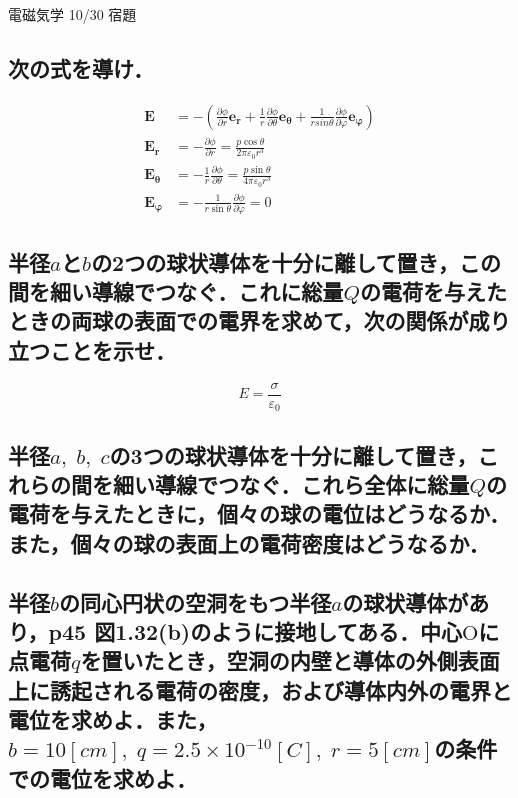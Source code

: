 \documentclass[a4j,12pt]{jsarticle}
\begin{document}
\begin{center}
    \begin{LARGE}
        {\huge 電磁気学 10/30 宿題} 
    \end{LARGE}
\end{center}

\subsection{次の式を導け．}
\vspace*{-2em}
\begin{align}
    \bm{E} &= -\left(\frac{\partial \phi}{\partial r}\bm{e_r}+\frac{1}{r}\frac{\partial \phi}{\partial \theta}\bm{e_\theta}+\frac{1}{rsin\theta}\frac{\partial \phi}{\partial \varphi}\bm{e_\varphi}\right) \\
    \bm{E_r} &= -\frac{\partial \phi}{\partial r} = \frac{p\cos\theta}{2\pi\varepsilon_0r^3} \\
    \bm{E_\theta} &= -\frac{1}{r}\frac{\partial \phi}{\partial \theta} = \frac{p\sin\theta}{4\pi\varepsilon_0r^3} \\
    \bm{E_\varphi} &= -\frac{1}{r\sin\theta}\frac{\partial \phi}{\partial \varphi} = 0
\end{align}

\newpage

\subsection{半径\(a\)と\(b\)の2つの球状導体を十分に離して置き，この間を細い導線でつなぐ．これに総量\(Q\)の電荷を与えたときの両球の表面での電界を求めて，次の関係が成り立つことを示せ．}
\vspace*{-1em}
\begin{equation}
E=\frac{\sigma}{\varepsilon_0}
\end{equation}

\vspace{18em}

\subsection{半径\(a,\;b,\;c\)の3つの球状導体を十分に離して置き，これらの間を細い導線でつなぐ．これら全体に総量\(Q\)の電荷を与えたときに，個々の球の電位はどうなるか．また，個々の球の表面上の電荷密度はどうなるか．}
\newpage

\subsection{半径\(b\)の同心円状の空洞をもつ半径\(a\)の球状導体があり，p45 図1.32(b)のように接地してある．中心\(\mathrm{O}\)に点電荷\(q\)を置いたとき，空洞の内壁と導体の外側表面上に誘起される電荷の密度，および導体内外の電界と電位を求めよ．また，\(b=10\si{[cm]},\;q=2.5\times10^{-10}\si{[C]},\;r=5\si{[cm]}\)の条件での電位を求めよ．}
\end{document}
